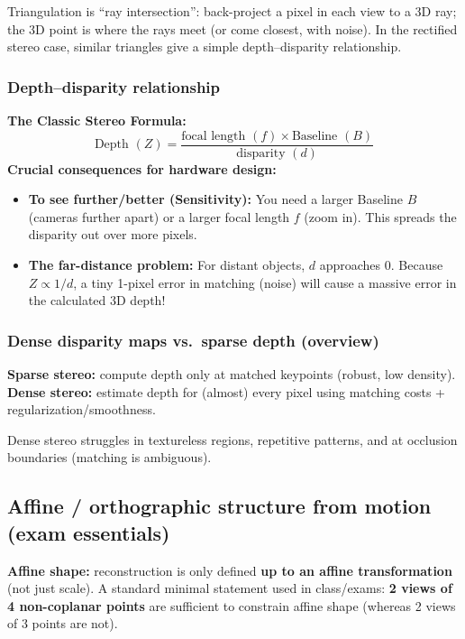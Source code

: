 \documentclass[11pt,a4paper]{article}
\begin{document}
\begin{intbox}
Triangulation is ``ray intersection'':
back-project a pixel in each view to a 3D ray; the 3D point is where the rays meet (or come closest, with noise).
In the rectified stereo case, similar triangles give a simple depth--disparity relationship.
\end{intbox}

\subsubsection{Depth--disparity relationship}

\begin{mathrule}
\textbf{The Classic Stereo Formula:}
\[
\text{Depth } (Z) = \frac{\text{focal length } (f) \times \text{Baseline } (B)}{\text{disparity } (d)}
\]
\textbf{Crucial consequences for hardware design:}
\begin{itemize}
  \item \textbf{To see further/better (Sensitivity):} You need a larger Baseline $B$ (cameras further apart) or a larger focal length $f$ (zoom in). This spreads the disparity out over more pixels.
  \item \textbf{The far-distance problem:} For distant objects, $d$ approaches 0. Because $Z \propto 1/d$, a tiny 1-pixel error in matching (noise) will cause a massive error in the calculated 3D depth!
\end{itemize}
\end{mathrule}

\subsubsection{Dense disparity maps vs.\ sparse depth (overview)}

\begin{defbox}
\textbf{Sparse stereo:} compute depth only at matched keypoints (robust, low density).
\quad
\textbf{Dense stereo:} estimate depth for (almost) every pixel using matching costs + regularization/smoothness.
\end{defbox}

\begin{notebox}
Dense stereo struggles in textureless regions, repetitive patterns, and at occlusion boundaries (matching is ambiguous).
\end{notebox}

\subsection{Affine / orthographic structure from motion (exam essentials)}
\begin{notebox}
\textbf{Affine shape:} reconstruction is only defined \textbf{up to an affine transformation} (not just scale).
A standard minimal statement used in class/exams: \textbf{2 views of 4 non-coplanar points} are sufficient to constrain affine shape (whereas 2 views of 3 points are not).
\end{notebox}
\end{document}
